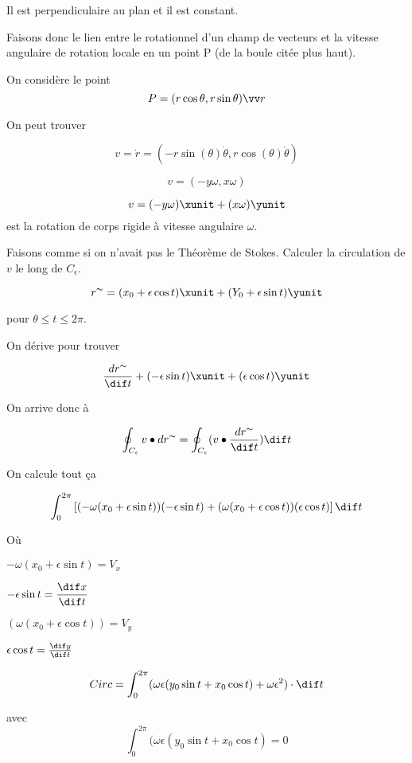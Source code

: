 Il est perpendiculaire au plan et il est constant.

Faisons donc le lien entre le rotationnel d'un champ de vecteurs et la vitesse angulaire de rotation locale en un point P (de la boule citée plus haut).

On considère le point
\[P = ( r \cos \theta, r \sin \theta ) \vv r \]

On peut trouver

\[ v = \dot{r} = \left(-r\sin(\theta) \dot{\theta}, r\cos(\theta) \dot{\theta} \right) \] %

\[v = (-y \omega , x \omega) \]

\[v=(-y\omega) \xunit + (x\omega) \yunit \] est la rotation de corps rigide à vitesse angulaire $\omega$.

Faisons comme si on n'avait pas le Théorème de Stokes. Calculer la circulation de $v$ le long de $C_{\epsilon}$.

\[ r^{\thicksim} = (x_0+ \epsilon \cos t ) \xunit +( Y_0 + \epsilon \sin t )\yunit \] 

pour $\theta \le t \le 2 \pi$.

On dérive pour trouver

\[\frac{d r^{\thicksim} }{\dif t} + ( -\epsilon \sin t ) \xunit + ( \epsilon \cos t ) \yunit \]

On arrive donc à

\[\oint_{C_{\epsilon}} v \bullet dr^{\thicksim} = \oint_{C_{\epsilon}} ( v \bullet \frac{dr^{\thicksim}}{\dif t} ) \dif t \]


On calcule tout ça

\[\int_0^{2\pi} \left[ (-\omega ( x_0 + \epsilon \sin t )) ( - \epsilon \sin t ) + (\omega ( x_0 + \epsilon \cos t))( \epsilon \cos t ) \right] \dif t \]

Où

$-\omega ( x_0 + \epsilon \sin t ) = V_x$



$- \epsilon \sin t  = \dfrac{\dif x}{\dif t}$



$(\omega ( x_0 + \epsilon \cos t)) = V_y$




$\epsilon \cos t =\frac{\dif y}{\dif t}$




\[Circ = \int_0^{2\pi} (\omega \epsilon ( y_0 \sin t + x_0 \cos t ) + \omega \epsilon ^2 )\cdot \dif t \]

avec \[ \int_0^{2\pi} (\omega \epsilon ( y_0 \sin t + x_0 \cos t )  = 0\]


